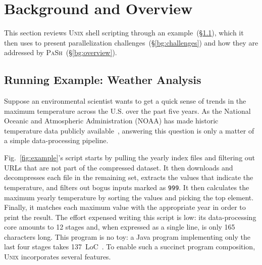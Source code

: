 \documentclass[sigplan, review, screen, anonymous]{acmart}
\newcommand{\ttt}[1]{\texttt{#1}}
\newcommand{\sx}[1]{(\S\ref{#1})}
\newcommand{\sys}{{\scshape PaSh}\xspace}
\newcommand{\unix}{{\scshape Unix}\xspace}
\begin{document}

\section{Background and Overview}
\label{bg}

This section reviews \unix shell scripting through an example~\sx{bg:pipelines}, which it then uses to present 
parallelization challenges~\sx{bg:challenges} and how they are addressed by \sys~\sx{bg:overview}.

\subsection{Running Example: Weather Analysis}
\label{bg:pipelines}

Suppose an environmental scientist    %
  wants to get a quick sense of trends in the maximum temperature across the U.S. over the past five years.
As the National Oceanic and Atmospheric Administration (NOAA) has made historic temperature data publicly available~\cite{noaa}, 
  answering this question is only a matter of a simple data-processing pipeline.

Fig.~\ref{fig:example}'s script starts by pulling the yearly index files and filtering out URLs that are not part of the compressed dataset.
It then downloads and decompresses each file in the remaining set, extracts the values that indicate the temperature, and filters out bogus inputs marked as \ttt{999}.
It then calculates the maximum yearly temperature by sorting the values and picking the top element.
Finally, it matches each maximum value with the appropriate year in order to print the result.
% 
The effort expensed writing this script is low:
  its data-processing core amounts to 12 stages and, when expressed as a single line, is only 165 characters long.
This program is no toy:
  a Java program implementing only the last four stages takes 137~LoC~\cite[\S2.1]{hadoop:15}.
To enable such a succinct program composition, \unix incorporates several features.
\end{document}
